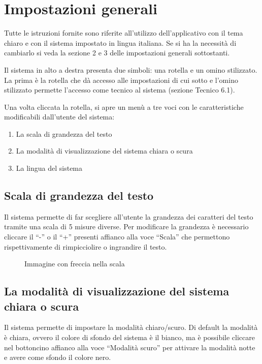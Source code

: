 \section{Impostazioni generali}

Tutte le istruzioni fornite sono riferite all'utilizzo dell'applicativo con il tema chiaro e con il sistema impostato in lingua italiana. Se si ha la necessità di cambiarlo si veda la sezione 2 e 3 delle impostazioni generali sottostanti.

Il sistema in alto a destra presenta due simboli: una rotella e un omino stilizzato. La prima è la rotella che dà accesso alle impostazioni di cui sotto e l'omino stilizzato permette l'accesso come tecnico al sistema (sezione Tecnico 6.1).

Una volta cliccata la rotella, si apre un menù a tre voci con le caratteristiche modificabili dall'utente del sistema:
\begin{enumerate}
    \item La scala di grandezza del testo
    \item La modalità di visualizzazione del sistema chiara o scura
    \item La lingua del sistema
\end{enumerate}

\subsection{Scala di grandezza del testo}

Il sistema permette di far scegliere all'utente la grandezza dei caratteri del testo tramite una scala di 5 misure diverse. Per modificare la grandezza è necessario cliccare il ``-'' o il ``+'' presenti affianco alla voce ``Scala'' che permettono rispettivamente di rimpicciolire o ingrandire il testo.

\begin{figure}[H]
    \centering
    \caption{Immagine con freccia nella scala}
  \end{figure}

\subsection{La modalità di visualizzazione del sistema chiara o scura}

Il sistema permette di impostare la modalità chiaro/scuro. Di default la modalità è chiara, ovvero il colore di sfondo del sistema è il bianco, ma è possibile cliccare nel bottoncino affianco alla voce ``Modalità scuro'' per attivare la modalità notte e avere come sfondo il colore nero.

